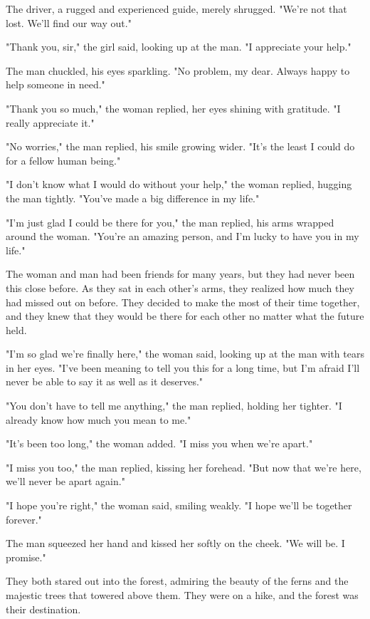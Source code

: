\documentclass[smalldemyvopaper,11pt,twoside,onecolumn,openright,extrafontsizes]{memoir}
\begin{document}
The driver, a rugged and experienced guide, merely shrugged. "We're not that lost. We'll find our way out."\par
"Thank you, sir," the girl said, looking up at the man. "I appreciate your help."\par
The man chuckled, his eyes sparkling. "No problem, my dear. Always happy to help someone in need."\par
"Thank you so much," the woman replied, her eyes shining with gratitude. "I really appreciate it."\par
"No worries," the man replied, his smile growing wider. "It's the least I could do for a fellow human being."\par
"I don't know what I would do without your help," the woman replied, hugging the man tightly. "You've made a big difference in my life."\par
"I'm just glad I could be there for you," the man replied, his arms wrapped around the woman. "You're an amazing person, and I'm lucky to have you in my life."\par
The woman and man had been friends for many years, but they had never been this close before. As they sat in each other's arms, they realized how much they had missed out on before. They decided to make the most of their time together, and they knew that they would be there for each other no matter what the future held.\par
"I'm so glad we're finally here," the woman said, looking up at the man with tears in her eyes. "I've been meaning to tell you this for a long time, but I'm afraid I'll never be able to say it as well as it deserves."\par
"You don't have to tell me anything," the man replied, holding her tighter. "I already know how much you mean to me."\par
"It's been too long," the woman added. "I miss you when we're apart."\par
"I miss you too," the man replied, kissing her forehead. "But now that we're here, we'll never be apart again."\par
"I hope you're right," the woman said, smiling weakly. "I hope we'll be together forever."\par
The man squeezed her hand and kissed her softly on the cheek. "We will be. I promise."\par
They both stared out into the forest, admiring the beauty of the ferns and the majestic trees that towered above them. They were on a hike, and the forest was their destination.\par
\end{document}
